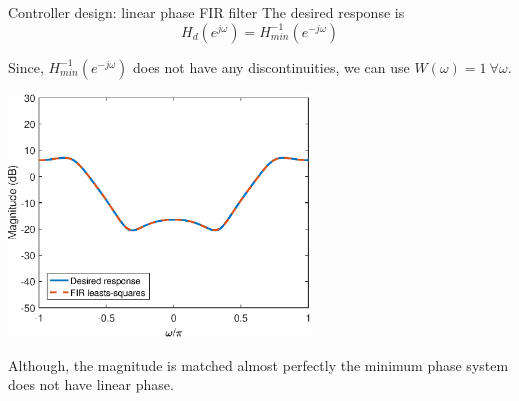 \documentclass[10pt]{beamer}
\begin{document}
%
\begin{frame}{Controller design: linear phase FIR filter}
	The desired response is 
	\begin{equation*}
		H_d(e^{j\omega}) = H_{min}^{-1}(e^{-j\omega})
	\end{equation*}
	
	Since, $H_{min}^{-1}(e^{-j\omega})$ does not have any discontinuities, we can use $W(\omega) = 1~\forall\omega$.
	
	\begin{center}
		\includegraphics[width=0.6\textwidth]{../homework/figs/inverse_control_controller_linear_phase.eps}
	\end{center}
	
	Although, the magnitude is matched almost perfectly the minimum phase system does not have linear phase. 
\end{frame}
\end{document}
